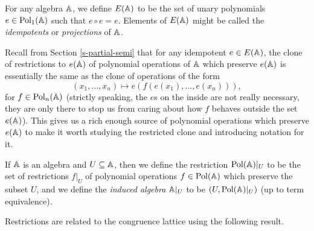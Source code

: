 \begin{appendices}
\begin{defn} For any algebra $\mathbb{A}$, we define $E(\mathbb{A})$ to be the set of unary polynomials $e \in \operatorname{Pol}_1(\mathbb{A})$ such that $e \circ e = e$. Elements of $E(\mathbb{A})$ might be called the \emph{idempotents} or \emph{projections} of $\mathbb{A}$.
\end{defn}

Recall from Section \ref{s-partial-semi} that for any idempotent $e \in E(\mathbb{A})$, the clone of restrictions to $e(\mathbb{A})$ of polynomial operations of $\mathbb{A}$ which preserve $e(\mathbb{A})$ is essentially the same as the clone of operations of the form
\[
(x_1, ..., x_n) \mapsto e(f(e(x_1), ..., e(x_n))),
\]
for $f \in \operatorname{Pol}_n(\mathbb{A})$ (strictly speaking, the $e$s on the inside are not really necessary, they are only there to stop us from caring about how $f$ behaves outside the set $e(\mathbb{A})$). This gives us a rich enough source of polynomial operations which preserve $e(\mathbb{A})$ to make it worth studying the restricted clone and introducing notation for it.

\begin{defn} If $\mathbb{A}$ is an algebra and $U \subseteq \mathbb{A}$, then we define the restriction $\operatorname{Pol}(\mathbb{A})|_U$ to be the set of restrictions $f|_U$ of polynomial operations $f \in \operatorname{Pol}(\mathbb{A})$ which preserve the subset $U$, and we define the \emph{induced algebra} $\mathbb{A}|_U$ to be $(U, \operatorname{Pol}(\mathbb{A})|_U)$ (up to term equivalence).
\end{defn}

Restrictions are related to the congruence lattice using the following result.


\end{appendices}
